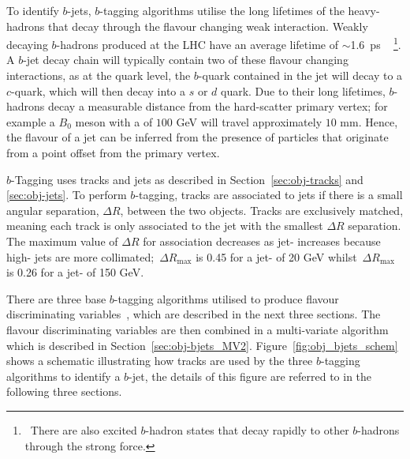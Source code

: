 To identify $b$-jets, $b$-tagging algorithms utilise the long lifetimes of the heavy-hadrons that decay through the flavour changing weak interaction.
Weakly decaying $b$-hadrons produced at the LHC have an average lifetime of $\sim$\SI{1.6}{\pico\second} ~\cite{obj-bjets_PDG}
 \footnote{\ There are also excited $b$-hadron states that decay rapidly to other $b$-hadrons through the strong force.}.
A $b$-jet decay chain  will typically contain two of these flavour changing interactions, 
as at the quark level, the $b$-quark contained in the jet will decay to a $c$-quark, which will then decay into a $s$ or $d$ quark.
Due to their long lifetimes, $b$-hadrons decay a measurable distance from the hard-scatter primary vertex;
for example a $B_0$ meson with a \pT{} of $100$ GeV will travel approximately $10$ mm.
Hence, the flavour of a jet can be inferred from the presence of particles
that originate from a point offset from the primary vertex.

$b$-Tagging uses tracks and jets as described in Section~\ref{sec:obj-tracks} and \ref{sec:obj-jets}.
To perform $b$-tagging, tracks are associated to jets if there is a small angular separation, $\Delta R$, between the two objects.
Tracks are exclusively matched, meaning each track is only associated to the jet with the smallest $\Delta R$ separation.
The maximum value of $\Delta R$ for association decreases as jet-\pT{} increases because high-\pT{} jets are more collimated;
$\,\Delta R_{\text{max}}$ is 0.45 for a jet-\pT{} of 20 GeV whilst $\,\Delta R_{\text{max}}$ is 0.26 for a jet-\pT{} of 150 GeV.

There are three base $b$-tagging algorithms utilised to produce flavour discriminating variables~\cite{obj-bjets_algo_2016}, which are described in the next three sections.
The flavour discriminating variables are then combined in a multi-variate algorithm which is described in Section~\ref{sec:obj-bjets_MV2}.
Figure~\ref{fig:obj_bjets_schem} shows a schematic illustrating how tracks
are used by the three $b$-tagging algorithms to identify a $b$-jet,
the details of this figure are referred to in the following three sections.

